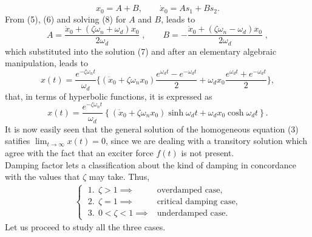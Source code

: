 \documentclass[12pt]{article}
\begin{document}
\begin{equation}
x_0=A+B,\qquad \dot{x}_0=As_1+Bs_2.
\end{equation}
From (5), (6) and solving (8) for $A$ and $B$, leads to
\begin{equation}
A=\frac{\dot{x}_0+(\zeta\omega_n+\omega_d)x_0}{2\omega_d}\;,\qquad B=-\frac{\dot{x}_0+(\zeta\omega_n-\omega_d)x_0}{2\omega_d}\;,
\end{equation} 
which substituted into the solution (7) and after an elementary algebraic manipulation, leads to
\begin{equation}
x(t)=\frac{e^{-\zeta\omega_n t}}{\omega_d}\bigg\{(\dot{x}_0+\zeta\omega_n x_0)\frac{e^{\omega_d t}-e^{-\omega_d t}}{2}+
\omega_d x_0\frac{e^{\omega_d t}+e^{-\omega_d t}}{2}\bigg\},
\end{equation}
that, in terms of hyperbolic functions, it is expressed as
\begin{equation}
x(t)=\frac{e^{-\zeta\omega_n t}}{\omega_d}\left\{(\dot{x}_0+\zeta\omega_n x_0)\sinh{\omega_d t}+
\omega_d x_0\cosh{\omega_d t}\right\}.
\end{equation}
It is now easily seen that the general solution of the homogeneous equation (3) satifies $\lim_{t\to\infty}x(t)=0$, since we are dealing with a transitory solution which agree with the fact that an exciter force $f(t)$ is not present. \\
Damping factor lets a classification about the kind of damping in concordance with the values that $\zeta$ may take. Thus,
\begin{align*}
\begin{cases}
\; 1. \;\, \zeta>1   \implies & \textrm{overdamped case}, \\
\; 2. \;\, \zeta=1   \implies & \textrm{critical damping case}, \\
\; 3. \;\, 0<\zeta<1 \implies & \textrm{underdamped case}.
\end{cases} 
\end{align*} 
Let us proceed to study all the three cases.
\end{document}
